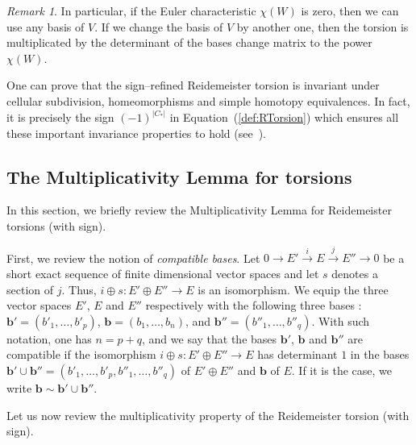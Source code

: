 \documentclass[a4paper]{amsart}
\theoremstyle{plain}
\theoremstyle{definition}
\theoremstyle{remark}
\newtheorem{remark}{Remark}%
\begin{document}
\begin{remark}
  In particular, if the Euler characteristic $\chi(W)$ is zero, then
  we can use any basis of $V$. If we change the basis of $V$ by another one, then the torsion is multiplicated 
by  the determinant of the bases change matrix to the power $\chi(W)$.
\end{remark}

One can prove that the sign--refined Reidemeister torsion is invariant 
under cellular subdivision, 
homeomorphisms and simple homotopy equivalences. In fact,
it is precisely the sign $(-1)^{|C_*|}$ in Equation~(\ref{def:RTorsion})
which ensures all these important invariance properties to hold (see~\cite{Turaev:2002}).


\subsection{The Multiplicativity Lemma for torsions}
\label{subsection:multiplicativitylemma}

In this section, we briefly review the Multiplicativity Lemma for
Reidemeister torsions (with sign). 

First, we review the notion of \emph{compatible bases}. Let $0 \to E'
\xrightarrow{i} E \xrightarrow{j} E'' \to 0$ be a short exact sequence
of finite dimensional vector spaces and let $s$ denotes a section of
$j$. Thus, $i \oplus s : E' \oplus E'' \to E$ is an isomorphism. We
equip the three vector spaces $E'$, $E$ and $E''$ respectively with
the following three bases : $\mathbf{b}' = \left( b'_1, \ldots,
  b'_p\right)$, $\mathbf{b} = \left(b_1, \ldots, b_n\right)$, and
$\mathbf{b}'' = \left(b''_1, \ldots, b''_q\right)$. With such
notation, one has $n = p+q$, and we say that the bases $\mathbf{b}'$,
$\mathbf{b}$ and $\mathbf{b}''$ are compatible if the isomorphism $i
\oplus s : E' \oplus E'' \to E$ has determinant $1$ in the bases
$\mathbf{b}' \cup \mathbf{b}'' = \left( b'_1, \ldots, b'_p, b''_1,
  \ldots, b''_q\right)$ of $E' \oplus E''$ and $\mathbf{b}$ of $E$. If
it is the case, we write $\mathbf{b} \sim \mathbf{b}' \cup
\mathbf{b}''$.

Let us now review the multiplicativity property of the Reidemeister torsion (with sign).
\end{document}
